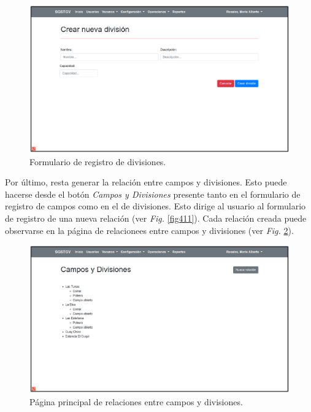 \documentclass[11pt,oneside]{book}
\begin{document}
\begin{figure}[tbhp]
\centerline{\includegraphics[scale=0.87]{figs/capitulo_3_desarrollo/fig409.pdf}}
\caption{Formulario de registro de divisiones.}
\label{fig409}
\end{figure}

\newpage
Por último, resta generar la relación entre campos y divisiones. Esto puede hacerse desde el botón \textit{Campos y Divisiones} presente tanto en el formulario de registro de campos como en el de divisiones. Esto dirige al usuario al formulario de registro de una nueva relación (ver \textit{Fig.} \ref{fig411}). Cada relación creada puede observarse en la página de relacionees entre campos y divisiones (ver \textit{Fig.} \ref{fig410}).

\begin{figure}[tbhp]
\centerline{\includegraphics[scale=0.87]{figs/capitulo_3_desarrollo/fig410.pdf}}
\caption{Página principal de relaciones entre campos y divisiones.}
\label{fig410}
\end{figure}
\end{document}
